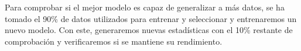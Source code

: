 \documentclass[10pt,a4paper,twoside]{article}
\begin{document}
\begin{multicols}{2}
    \begin{table}[H]
        \begin{center}
        \end{center}
        \caption{Rendimiento de modelos sobre los datos de entrenamiento y selección}
        \label{table:rendimientomodelos}
    \end{table}

    Para comprobar si el mejor modelo es capaz de generalizar a más datos, se ha tomado el 90\% de datos utilizados para entrenar y seleccionar y entrenaremos un nuevo modelo. Con este, generaremos nuevas estadísticas con el 10\% restante de comprobación y verificaremos si se mantiene su rendimiento.


\end{multicols}
\end{document}
